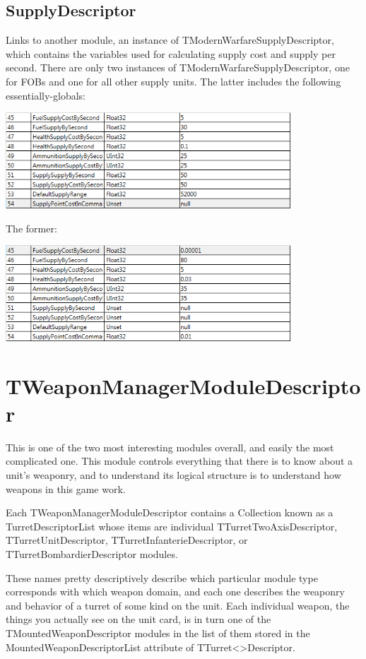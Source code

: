 \documentclass{article}
\begin{document}
\subsection{SupplyDescriptor}

Links to another module, an instance of TModernWarfareSupplyDescriptor, which contains the variables used for calculating supply cost and supply per second. There are only two instances of TModernWarfareSupplyDescriptor, one for FOBs and one for all other supply units. The latter includes the following essentially-globals:

\includegraphics[width=0.8\textwidth]{screenshot_supply}

The former:

\includegraphics[width=0.8\textwidth]{screenshot_supply_fob}

\section{TWeaponManagerModuleDescriptor}

This is one of the two most interesting modules overall, and easily the most complicated one. This module controls everything that there is to know about a unit's weaponry, and to understand its logical structure is to understand how weapons in this game work.

Each TWeaponManagerModuleDescriptor contains a Collection known as a TurretDescriptorList whose items are individual TTurretTwoAxisDescriptor, TTurretUnitDescriptor, TTurretInfanterieDescriptor, or TTurretBombardierDescriptor modules.

These names pretty descriptively describe which particular module type corresponds with which weapon domain, and each one describes the weaponry and behavior of a turret of some kind on the unit. Each individual weapon, the things you actually see on the unit card, is in turn one of the TMountedWeaponDescriptor modules in the list of them stored in the MountedWeaponDescriptorList attribute of TTurret\textless *\textgreater Descriptor.
\end{document}
